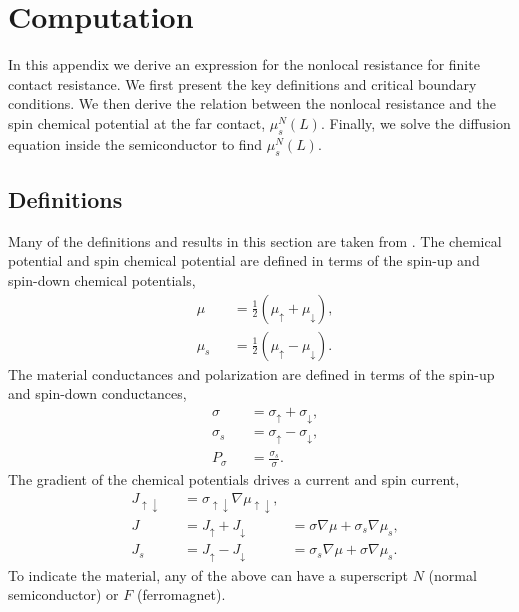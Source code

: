 \appendix
\section{Computation}
\label{s:appendix}

In this appendix we derive an expression for
the nonlocal resistance for finite contact resistance.
We first present the key definitions and critical boundary conditions.
We then derive the relation between the nonlocal resistance
and the spin chemical potential at the far contact, $μ_s^N (L)$.
Finally, we solve the diffusion equation inside the semiconductor to find $μ_s^N (L)$.

\subsection{Definitions}

Many of the definitions and results in this section are taken from
\cite{ActaPhysicaSlovaca.57.4_5.565-907}.
The chemical potential and spin chemical potential are defined in terms
of the spin-up and spin-down chemical potentials,
\begin{subequations}
  \label{eq:potentials}
  \begin{alignat}{2}
    & μ   && = \frac{1}{2} \left( μ_↑ + μ_↓ \right) , \\
    & μ_s && = \frac{1}{2} \left( μ_↑ - μ_↓ \right) .
  \end{alignat}
\end{subequations}
The material conductances and polarization are defined in terms
of the spin-up and spin-down conductances,
\begin{subequations}
  \label{eq:conductances}
  \begin{alignat}{2}
    & σ   && = σ_↑ + σ_↓ , \\
    & σ_s && = σ_↑ - σ_↓ , \\
    & P_σ && = \frac{σ_s}{σ} .
  \end{alignat}
\end{subequations}
The gradient of the chemical potentials drives a current and spin current,
\begin{subequations}
  \label{eq:currents}
  \begin{alignat}{3}
    & J_{↑↓} && = σ_{↑↓} ∇μ_{↑↓} , \\
    \label{eq:currents.current}
    & J      && = J_↑ + J_↓      & = σ   ∇μ + σ_s ∇μ_s , \\
    \label{eq:currents.spincurrent}
    & J_s    && = J_↑ - J_↓      & = σ_s ∇μ + σ   ∇μ_s .
  \end{alignat}
\end{subequations}
To indicate the material, any of the above can have a superscript
$N$ (normal semiconductor) or $F$ (ferromagnet).

